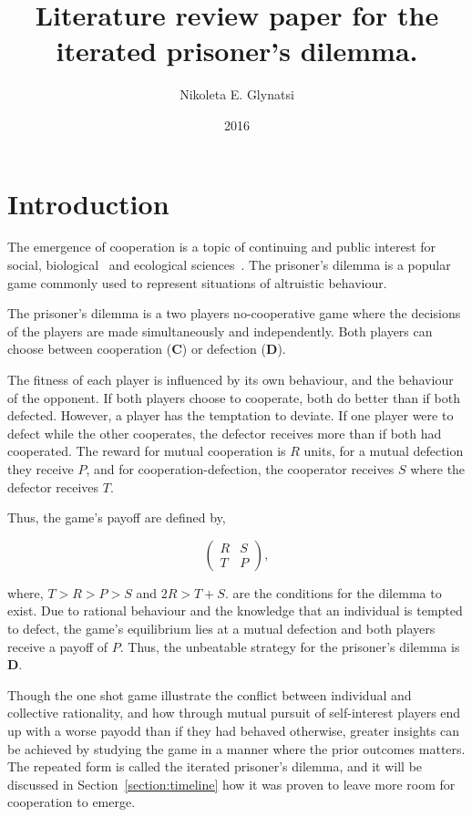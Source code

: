 \documentclass{article}
\title{Literature review paper for the iterated prisoner's dilemma.}
\author{Nikoleta E. Glynatsi}
\date{2016}
\begin{document}
\maketitle

\section{Introduction}\label{section:introduction}

The emergence of cooperation is a topic of continuing and public interest
for social, biological~\cite{Douglas2011}
and ecological sciences~\cite{Godfray1992,Krama2012,Milinski1987,Wilkinson1984}.
The prisoner's dilemma is a popular game commonly used to represent situations
of altruistic behaviour.

The prisoner's dilemma is a two players no-cooperative game where the decisions
of the players are made simultaneously and independently. Both players can
choose between cooperation (\textbf{C}) or defection (\textbf{D}).

The fitness of each player is influenced by its own behaviour, and the behaviour
of the opponent. If both players choose to cooperate, both do better
than if both defected. However, a player has the temptation to deviate. If one
player were to defect while the other cooperates, the defector receives
more than if both had cooperated. The reward for mutual cooperation is \(R\)
units, for a mutual defection they receive \(P\), and for cooperation-defection,
the cooperator receives \(S\) where the defector receives \(T\).

Thus, the game's payoff are  defined by,

\begin{equation} \label{eq:the_pd_payoffs}
	\begin{pmatrix} 
	R & S \\ T & P
	\end{pmatrix},
\end{equation}

where, \(T > R > P > S \) and \(2R > T + S.\) are the conditions for the dilemma
to exist. Due to rational behaviour and the knowledge that an individual is tempted
to defect, the game's equilibrium lies at a mutual defection and both players
receive a payoff of \(P\). Thus, the unbeatable strategy for the prisoner's dilemma
is \textbf{D}.

Though the one shot game illustrate the conflict between individual and collective
rationality, and how through mutual pursuit of self-interest players end up with
a worse payodd than if they had behaved otherwise, greater insights can be achieved 
by studying the game in a manner where the prior outcomes matters. The
repeated form is called the iterated prisoner's dilemma, and it will be discussed
in Section~\ref{section:timeline} how it was proven to leave more room for cooperation
to emerge.
\end{document}
